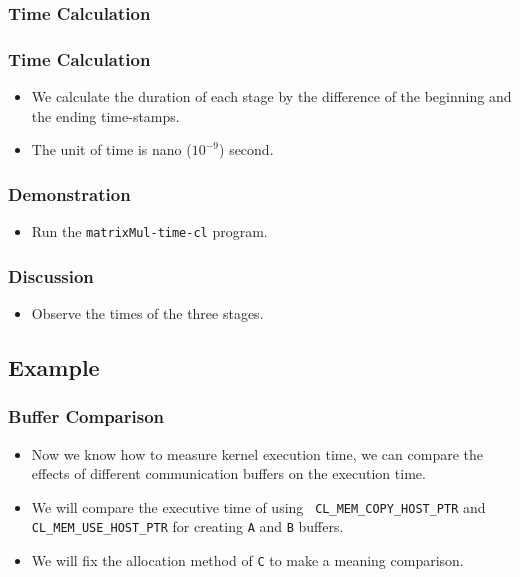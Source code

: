 \documentclass{beamer}
\begin{document}
\begin{frame}
  \frametitle{Time Calculation}
\end{frame}

\begin{frame}
  \frametitle{Time Calculation}
  \begin{itemize}
  \item We calculate the duration of each stage by the difference of
    the beginning and the ending time-stamps.
  \item The unit of time is nano ($10^{-9}$) second. 
  \end{itemize}
\end{frame}

\begin{frame}
\end{frame}

\begin{frame}
  \frametitle{Demonstration}
  \begin{itemize}
    \item Run the {\tt matrixMul-time-cl} program.
  \end{itemize}
\end{frame}

\begin{frame}
  \frametitle{Discussion}
  \begin{itemize}
  \item Observe the times of the three stages.
  \end{itemize}
\end{frame}

\subsection{Example}

\begin{frame}
  \frametitle{Buffer Comparison}
  \begin{itemize}
    \item Now we know how to measure kernel execution time, we can
      compare the effects of different communication buffers on the
      execution time.
    \item We will compare the executive time of using {\tt
      CL\_MEM\_COPY\_HOST\_PTR} and {\tt CL\_MEM\_USE\_HOST\_PTR} for
      creating {\tt A} and {\tt B} buffers.
    \item We will fix the allocation method of {\tt C} to make a
      meaning comparison.
  \end{itemize}
\end{frame}
\end{document}
